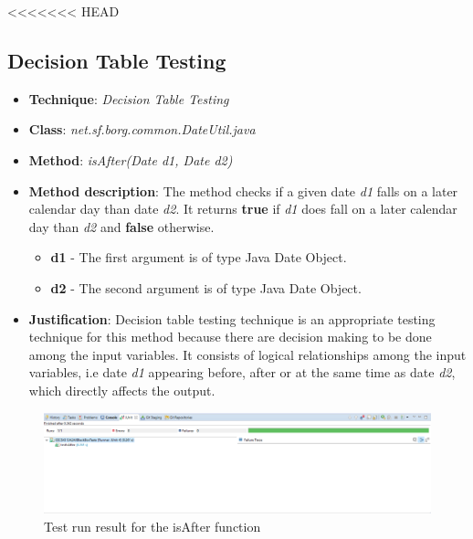 \documentclass[fontsize=12pt,paper=letter,twoside]{scrartcl}
\begin{document}
\newpage
<<<<<<< HEAD
\subsection{Decision Table Testing}

\begin{itemize}
\item \textbf{Technique}: \emph{Decision Table Testing}
\item \textbf{Class}: \emph{net.sf.borg.common.DateUtil.java}
\item \textbf{Method}: \emph{isAfter(Date d1, Date d2)}
\item \textbf{Method description}: The method checks if a given date \emph{d1} falls on a later calendar day than date \emph{d2}. It returns \textbf{true} if \emph{d1} does fall on a later calendar day than \emph{d2} and \textbf{false} otherwise.
\begin{itemize}
\item \textbf{d1} - The first argument is of type Java Date Object.
\item \textbf{d2} - The second argument is of type Java Date Object.
\end{itemize}
\item \textbf{Justification}: Decision table testing technique is an appropriate testing technique for this method because there are decision making to be done among the input variables. It consists of logical relationships among the input variables, i.e date \emph{d1} appearing before, after or at the same time as date \emph{d2}, which directly affects the output.
\end{itemize}

\begin{figure}[!htb]
\begin{center}
\includegraphics[width=.99\textwidth]{images/wbt/dtt/test-run.png}
\end{center}
\caption{Test run result for the isAfter function}
\label{fig:wbt_dtt_test_run}
\end{figure}
\end{document}
